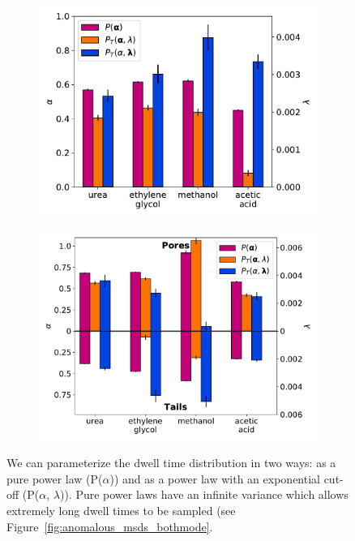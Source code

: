 \documentclass{article}
\begin{document}
  \begin{figure}
  \centering
  \begin{subfigure}{0.45\textwidth}
  \includegraphics[width=\textwidth]{1mode_AD_dwells.pdf}
  \caption{}\label{fig:1mode_AD_dwells}
  \end{subfigure}
  \begin{subfigure}{0.45\textwidth}
  \includegraphics[width=\textwidth]{2mode_AD_dwells.pdf}
  \caption{}\label{fig:2mode_AD_dwells}
  \end{subfigure}
  \caption{We can parameterize the dwell time distribution in two ways: as a pure
  power law (P($\alpha$)) and as a power law with an exponential cut-off (P($\alpha$, $\lambda$)).
  Pure power laws have an infinite variance which allows extremely long dwell
  times to be sampled (see Figure~\ref{fig:anomalous_msds_bothmode}.
  }\label{fig:pure_power_law_params}
  \end{figure} 
  
\end{document}
